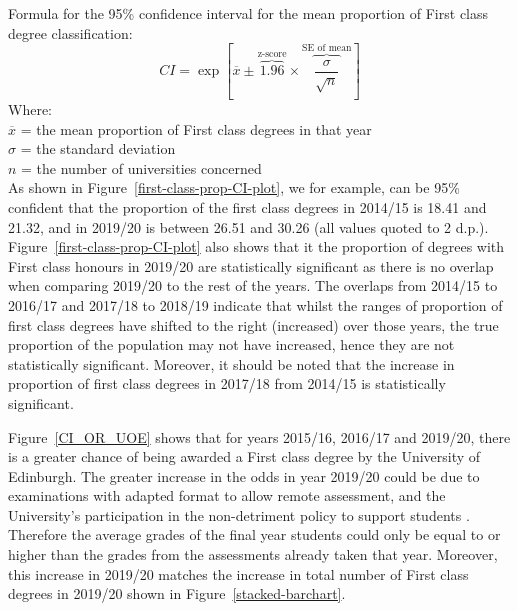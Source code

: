 \documentclass[11pt,a4paper]{article}
\begin{document}
Formula for the 95\% confidence interval for the mean proportion of First class degree classification:
\setlength{\belowdisplayskip}{4pt} \setlength{\belowdisplayshortskip}{4pt}
\setlength{\abovedisplayskip}{4pt} \setlength{\abovedisplayshortskip}{4pt}
\begin{equation}
    CI = \exp{\left[ \overline{x} \pm \overbrace{1.96}^\text{z-score}\times\overbrace{\frac{\sigma}{\sqrt{n}}}^\text{SE of mean}\right]}
\end{equation}
Where:\\
$\overline{x}$ = the mean proportion of First class degrees in that year\\ 
$\sigma$ = the standard deviation \\
$n$ = the number of universities concerned\\

As shown in Figure~\ref{first-class-prop-CI-plot}, we for example, can be 95\% confident that the proportion of the first class degrees in 2014/15 is 18.41 and 21.32, and in 2019/20 is between 26.51 and 30.26 (all values quoted to 2 d.p.). Figure~\ref{first-class-prop-CI-plot} also shows that it the proportion of degrees with First class honours in 2019/20 are statistically significant as there is no overlap when comparing 2019/20 to the rest of the years. The overlaps from 2014/15 to 2016/17 and 2017/18 to 2018/19 indicate that whilst the ranges of proportion of first class degrees have shifted to the right (increased) over those years, the true proportion of the population may not have increased, hence they are not statistically significant. Moreover, it should be noted that the increase in proportion of first class degrees in 2017/18 from 2014/15 is statistically significant.

Figure~\ref{CI_OR_UOE} shows that for years 2015/16, 2016/17 and 2019/20, there is a greater chance of being awarded a First class degree by the University of Edinburgh. The greater increase in the odds in year 2019/20 could be due to examinations with adapted format to allow remote assessment, and the University's participation in the non-detriment policy to support students \cite{UOE_Covid_assessment_policy}. Therefore the average grades of the final year students could only be equal to or higher than the grades from the assessments already taken that year. Moreover, this increase in 2019/20 matches the increase in total number of First class degrees in 2019/20 shown in Figure~\ref{stacked-barchart}.
\end{document}
